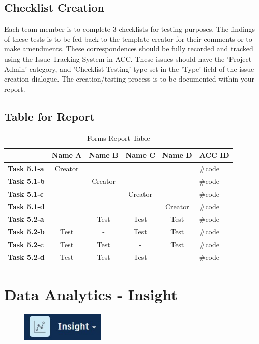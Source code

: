 \subsection{Checklist Creation}

Each team member is to complete 3 checklists for testing purposes.  The findings of these tests is to be fed back to the template creator for their comments or to make amendments.  These correspondences should be fully recorded and tracked using the Issue Tracking System in ACC. These issues should have the 'Project Admin' category, and 'Checklist Testing' type set in the 'Type' field of the issue creation dialogue.  The creation/testing process is to be documented within your report.  

\subsection{Table for Report}

\begin{table}[ht]
	\centering
	\begin{tabular}{|l|c|c|c|c|l|}
		\hline
		& \textbf{Name A} & \textbf{Name B} & \textbf{Name C} & \textbf{Name D} & \textbf{ACC ID}\\
		\hline
		\textbf{Task 5.1-a} &  Creator &  &  &  & \#code\\
		\textbf{Task 5.1-b} &  & Creator &  &  & \#code\\
		\textbf{Task 5.1-c} &  &  & Creator &  & \#code\\
		\textbf{Task 5.1-d} &  &  &  & Creator & \#code\\
		\hline
		\textbf{Task 5.2-a} & - & Test & Test & Test & \#code\\
		\textbf{Task 5.2-b} & Test & - & Test & Test & \#code\\
		\textbf{Task 5.2-c} & Test & Test & - & Test & \#code\\
		\textbf{Task 5.2-d} & Test & Test & Test & - & \#code\\
		\hline
	\end{tabular}
	\caption{Forms Report Table }
	\label{tab:field-items}
\end{table}


\newpage

\section{Data Analytics - Insight}

\begin{figure}[h!t]
	\includegraphics[width=4.0cm]{RevitAssets/insight}
	\label{fig:insight}
\end{figure}




